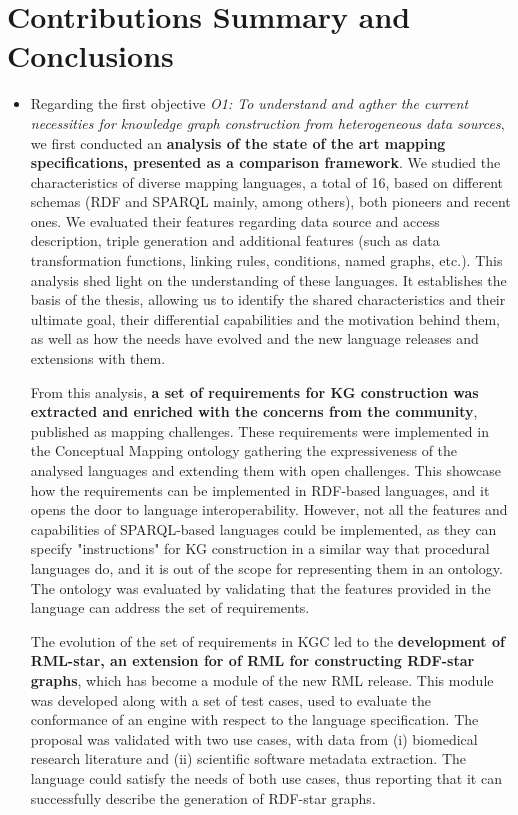 \section{Contributions Summary and Conclusions}
\label{sec:chp7_summary}
\begin{itemize}
    \item Regarding the first objective \textit{O1: To understand and agther the current necessities for knowledge graph construction from heterogeneous data sources}, we first conducted an \textbf{analysis of the state of the art mapping specifications, presented as a comparison framework}. 
    We studied the characteristics of diverse mapping languages, a total of 16, based on different schemas (RDF and SPARQL mainly, among others), both pioneers and recent ones. 
    We evaluated their features regarding data source and access description, triple generation and additional features (such as data transformation functions, linking rules, conditions, named graphs, etc.). 
    This analysis shed light on the understanding of these languages. It establishes the basis of the thesis, allowing us to identify the shared characteristics and their ultimate goal, their differential capabilities and the motivation behind them, as well as how the needs have evolved and the new language releases and extensions with them.
    
    From this analysis, \textbf{a set of requirements for KG construction was extracted and enriched with the concerns from the community}, published as mapping challenges. 
    These requirements were implemented in the Conceptual Mapping ontology gathering the expressiveness of the analysed languages and extending them with open challenges. This showcase how the requirements can be implemented in RDF-based languages, and it opens the door to language interoperability. 
    However, not all the features and capabilities of SPARQL-based languages could be implemented, as they can specify "instructions" for KG construction in a similar way that procedural languages do, and it is out of the scope for representing them in an ontology. 
    The ontology was evaluated by validating that the features provided in the language can address the set of requirements. 
    
    The evolution of the set of requirements in KGC led to the \textbf{development of RML-star, an extension for of RML for constructing RDF-star graphs}, which has become a module of the new RML release. 
    This module was developed along with a set of test cases, used to evaluate the conformance of an engine with respect to the language specification. 
    The proposal was validated with two use cases, with data from (i) biomedical research literature and (ii) scientific software metadata extraction. 
    The language could satisfy the needs of both use cases, thus reporting that it can successfully describe the generation of RDF-star graphs. 
    

\end{itemize}
